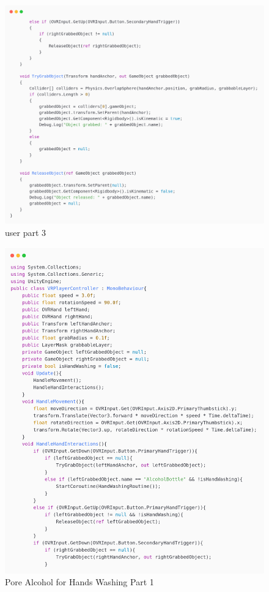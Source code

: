 \newpage
\begin{figure}[h] 
	\centering
	\includegraphics[width=1\textwidth, height=0.7\textheight]{Images/playerp3.png}
	\caption{user part 3}
	\label{fig:Hands Washing}
\end{figure}
\newpage
\begin{figure}[h]
	\centering
	\includegraphics[width=1\textwidth, height=0.7\textheight]{Images/pore alcohol1.png}
	\caption{Pore Alcohol for Hands Washing Part 1}
	\label{fig:Grabbing-Tool}
\end{figure}
